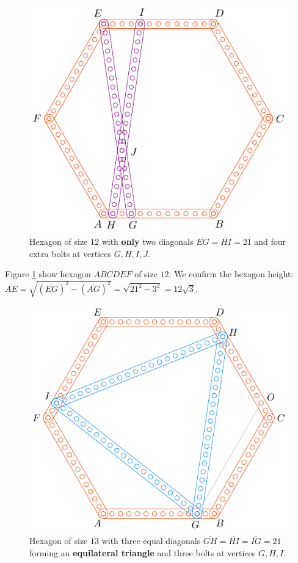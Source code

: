 \documentclass[11pt]{article}
\begin{document}
\begin{figure}[H]
\centering
\includegraphics[scale=1]{12/hexa-12a}
\caption{Hexagon of size $12$ with \textbf{only} two diagonals $\overline{EG} = \overline{HI} = 21$ and four extra bolts at vertices $G,H,I,J$.}
\label{fig:12a}
\end{figure}

Figure \ref{fig:12a} show hexagon $ABCDEF$ of size $12$. We confirm the hexagon height: $\overline{AE} = \sqrt{(\overline{EG})^2 - (\overline{AG})^2} = \sqrt{21^2 - 3^2} = 12\sqrt3$.


\begin{figure}[H]
\centering
\includegraphics[scale=1]{13/hexa-13a}
\caption{Hexagon of size $13$ with three equal diagonals $\overline{GH} = \overline{HI} = \overline{IG} = 21$ forming an \textbf{equilateral triangle} and three bolts at vertices $G,H,I$.}
\label{fig:13a}
\end{figure}
\end{document}

